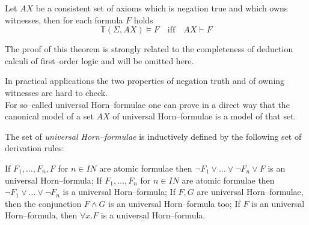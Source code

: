 \documentclass[landscape, autoslides, light]{mmiss}
\newcommand{\ns}{\normalsize}
\newcommand{\nat}{{I\!\!N}}
\begin{document}
\begin{Package}[Label={FSDPT}, Title={Formal Specification of Data and Process Types}, ShortTitle={FSDPT}, Authors={Horst Reichel}, Date={February 2003}, LevelOfDetail=Lecture, Language=en-GB]
\begin{Section}[Title={Initial Algebras as Data Types}, Label={section3}]
\begin{Section}[Title={Existence of initial models}, Label={section3_1}]
\begin{Paragraph}[Label=Paragraph36]
\end{Paragraph}
\begin{Paragraph}[Label=Paragraph37]
\ns
\begin{Theorem}[Title = {Initial Algebras as Data Types}, Label = {Theorem2}] Let $AX$ be a consistent set
of axioms which is negation true and which owns witnesses, then
for each formula $F$ holds
$$\mathbb{T}(\Sigma,AX) \vDash F \quad \mbox{iff} \quad AX \vdash
F$$
\end{Theorem}\pause
\small

The proof of this theorem is strongly related to the completeness
of deduction calculi of first--order logic and will be omitted
here.


\end{Paragraph}
\begin{Paragraph}[Label=Paragraph38]

In practical applications the two properties of
negation truth and of owning witnesses are hard to check. \\
\pause For so--called universal Horn--formulae one can prove in a
direct way that the canonical model of a set $AX$  of universal
Horn--formulae is a model of that set.


\end{Paragraph}
\begin{Paragraph}[Title={Universal Horn--formulae}, Label=Paragraph39]
The set of \emph{universal Horn--formulae} is inductively defined
by the following set of derivation rules:
\begin{List}[ListType=enumerate]
  \ListItem  If $F_1, \ldots , F_n, F$ for $n \in \nat$ are atomic
  formulae then $\neg F_1 \vee \ldots \vee \neg F_n \vee F$ is an
  universal Horn--formula; \pause
  \ListItem If $F_1, \ldots , F_n$ for $n \in \nat$ are atomic
  formulae then $\neg F_1 \vee \ldots \vee \neg F_n$ is a
  universal Horn--formula;\pause
  \ListItem If $F, G$ are universal Horn--formulae, then the conjunction $F
  \wedge G$ is an universal Horn--formula too; \pause
  \ListItem If $F$ is an universal Horn--formula, then $\forall x . F$
  is a universal Horn--formula.
\end{List}



\end{Paragraph}
\end{Section}
\end{Section}
\end{Package}
\end{document}
